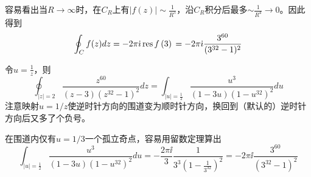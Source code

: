 \documentclass[CJK]{beamer}
\begin{document}
\begin{frame}
\bch
{}
容易看出当$R\rightarrow \infty$时，在$C_R$上有$|f(z)|\sim \frac{1}{R^5}$，沿$C_R$积分后最多$\sim \frac{1}{R^4} \rightarrow 0$。因此得到
$$ \oint_C f(z) dz  = -2\pi{\dot{\imath}} \,\mathrm{res}\,f\left(3\right)\, = -2\pi{\dot{\imath}}\frac{3^{60}}{(3^{32}-1)^2} $$
\ech
\end{frame}


\begin{frame}
\bch
令$u = \frac{1}{z}$，则
$$\oint_{|z|=2} \frac{z^{60}}{(z-3)\left(z^{32}-1\right)^2} dz = \int_{|u|=\frac{1}{2}} \frac{u^3}{(1-3u)\left(1-u^{32}\right)^2} du $$
{\scriptsize 注意映射$u=1/z$使逆时针方向的围道变为顺时针方向，换回到（默认的）逆时针方向后又多了个负号。}

在围道内仅有$u=1/3$一个孤立奇点，容易用留数定理算出
$$ \int_{|u|=\frac{1}{2}} \frac{u^3}{(1-3u)\left(1-u^{32}\right)^2} du = -\frac{2\pi\ii}{3} \frac{1}{3^3\left(1-\frac{1}{3^{32}}\right)^2} = -2\pi\ii \frac{3^{60}}{\left(3^{32}-1\right)^2} $$

\ech
\end{frame}
\end{document}
